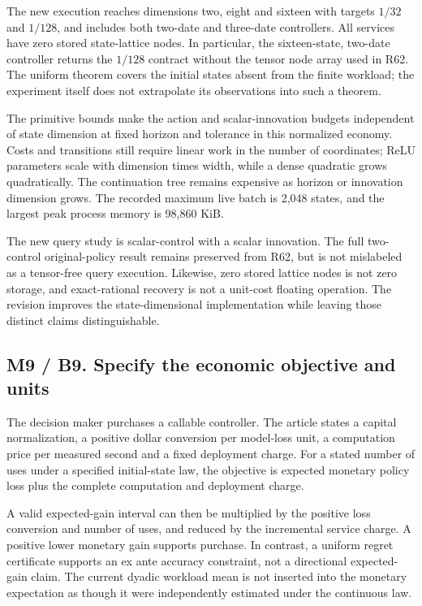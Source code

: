 \documentclass[ecta,nameyear,draft]{econsocart}
\begin{document}
The new execution reaches dimensions two, eight and sixteen with targets
\(1/32\) and \(1/128\), and includes both two-date and three-date
controllers. All services have zero stored state-lattice nodes. In
particular, the sixteen-state, two-date controller returns the \(1/128\)
contract without the tensor node array used in R62. The uniform theorem
covers the initial states absent from the finite workload; the
experiment itself does not extrapolate its observations into such a
theorem.

The primitive bounds make the action and scalar-innovation budgets
independent of state dimension at fixed horizon and tolerance in this
normalized economy. Costs and transitions still require linear work in
the number of coordinates; ReLU parameters scale with dimension times
width, while a dense quadratic grows quadratically. The continuation
tree remains expensive as horizon or innovation dimension grows. The
recorded maximum live batch is 2,048 states, and the largest peak
process memory is 98,860 KiB.

The new query study is scalar-control with a scalar innovation. The full
two-control original-policy result remains preserved from R62, but is
not mislabeled as a tensor-free query execution. Likewise, zero stored
lattice nodes is not zero storage, and exact-rational recovery is not a
unit-cost floating operation. The revision improves the
state-dimensional implementation while leaving those distinct claims
distinguishable.

\hypertarget{m9-b9.-specify-the-economic-objective-and-units}{%
\subsection{M9 / B9. Specify the economic objective and
units}\label{m9-b9.-specify-the-economic-objective-and-units}}

The decision maker purchases a callable controller. The article states a
capital normalization, a positive dollar conversion per model-loss unit,
a computation price per measured second and a fixed deployment charge.
For a stated number of uses under a specified initial-state law, the
objective is expected monetary policy loss plus the complete computation
and deployment charge.

A valid expected-gain interval can then be multiplied by the positive
loss conversion and number of uses, and reduced by the incremental
service charge. A positive lower monetary gain supports purchase. In
contrast, a uniform regret certificate supports an ex ante accuracy
constraint, not a directional expected-gain claim. The current dyadic
workload mean is not inserted into the monetary expectation as though it
were independently estimated under the continuous law.
\end{document}

